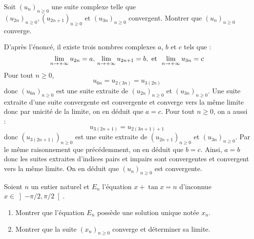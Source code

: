 \documentclass[a4paper,10pt]{report}
\begin{document}
\medskip

\begin{Exa} Soit $(u_n)_{n \geq 0}$ une suite complexe telle que $(u_{2n})_{n \geq 0},(u_{2n + 1})_{n \geq 0}{\text{ et }}(u_{3n})_{n \geq 0}$ convergent. Montrer que $(u_n)_{n \geq 0}$ converge.
\end{Exa} 

\corr D'après l'énoncé, il existe trois nombres complexes $a$, $b$ et $c$ tels que :
$$ \lim_{n \rightarrow + \infty} u_{2n} = a, \,  \lim_{n \rightarrow + \infty} u_{2n+1} = b,  \hbox{ et } \, \lim_{n \rightarrow + \infty} u_{3n} = c$$
Pour tout $n \geq 0$,
$$ u_{6n} = u_{2(3n)}=u_{3(2n)}$$
donc $(u_{6n})_{n \geq 0}$ est une suite extraite de $(u_{2n})_{n \geq 0}$ et $(u_{3n})_{n \geq 0}$. Une suite extraite d'une suite convergente est convergente et converge vers la même limite donc par unicité de la limite, on en déduit que $a=c$. Pour tout $n \geq 0$, on a aussi :
$$ u_{3(2n+1)}=u_{2(3n+1)+1}$$
donc $(u_{3(2n+1)})_{n \geq 0}$ est une suite extraite de $(u_{2n+1})_{n \geq 0}$ et $(u_{3n})_{n \geq 0}$. Par le même raisonnement que précédemment, on en déduit que $b=c$. Ainsi, $a=b$ donc les suites extraites d'indices pairs et impairs sont convergentes et convergent vers la même limite. On en déduit que $(u_n)_{n \geq 0}$ est convergente. 

\medskip

\begin{Exa} Soient $n$ un entier naturel et $E_n $ l'équation $x + \tan x = n$ d'inconnue $x \in \left] { - \pi  / 2,\pi  / 2} \right[$.

\begin{enumerate}
\item Montrer que l'équation $E_n$ possède une solution unique notée $x_n$.
\item Montrer que la suite $(x_n)_{n \geq 0}$ converge et déterminer sa limite.
\end{enumerate}
\end{Exa} 

\corr 
\end{document}

